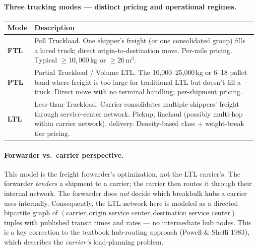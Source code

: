 \documentclass[11pt,a4paper]{article}
\theoremstyle{definition}
\begin{document}
\paragraph{Three trucking modes — distinct pricing and operational regimes.}

\begin{center}
\begin{tabular}{lp{12cm}}
\toprule
Mode & Description \\
\midrule
\textbf{FTL} & Full Truckload. One shipper's freight (or one consolidated group) fills a hired truck; direct origin-to-destination move. Per-mile pricing. Typical $\geq 10{,}000$\,kg or $\geq 26\,\text{m}^3$. \\
\textbf{PTL} & Partial Truckload / Volume LTL. The 10{,}000--25{,}000\,kg or 6--18 pallet band where freight is too large for traditional LTL but doesn't fill a truck. Direct move with no terminal handling; per-shipment pricing. \\
\textbf{LTL} & Less-than-Truckload. Carrier consolidates multiple shippers' freight through service-center network. Pickup, linehaul (possibly multi-hop within carrier network), delivery. Density-based class + weight-break tier pricing. \\
\bottomrule
\end{tabular}
\end{center}

\paragraph{Forwarder vs.\ carrier perspective.}
This model is the freight forwarder's optimization, not the LTL carrier's. The forwarder
\emph{tenders} a shipment to a carrier; the carrier then routes it through their internal
network. The forwarder does \emph{not} decide which breakbulk hubs a carrier uses internally.
Consequently, the LTL network here is modeled as a directed bipartite graph of
$(\text{carrier}, \text{origin service center}, \text{destination service center})$ tuples
with published transit times and rates --- no intermediate hub nodes. This is a key
correction to the textbook hub-routing approach (Powell \& Sheffi 1983), which describes the
\emph{carrier's} load-planning problem.
\end{document}
